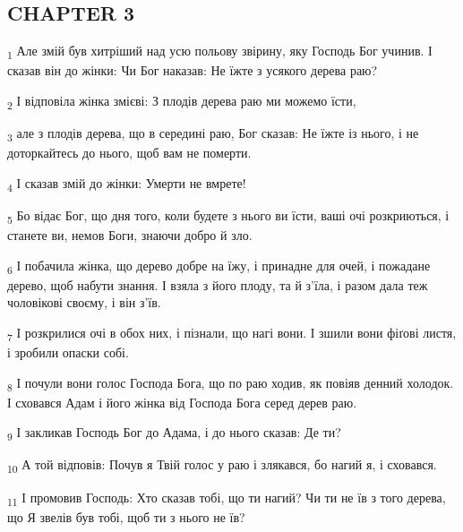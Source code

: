 \subsection{CHAPTER 3}
\begin{tcolorbox}
\textsubscript{1} Але змій був хитріший над усю польову звірину, яку Господь Бог учинив. І сказав він до жінки: Чи Бог наказав: Не їжте з усякого дерева раю?
\end{tcolorbox}
\begin{tcolorbox}
\textsubscript{2} І відповіла жінка змієві: З плодів дерева раю ми можемо їсти,
\end{tcolorbox}
\begin{tcolorbox}
\textsubscript{3} але з плодів дерева, що в середині раю, Бог сказав: Не їжте із нього, і не доторкайтесь до нього, щоб вам не померти.
\end{tcolorbox}
\begin{tcolorbox}
\textsubscript{4} І сказав змій до жінки: Умерти не вмрете!
\end{tcolorbox}
\begin{tcolorbox}
\textsubscript{5} Бо відає Бог, що дня того, коли будете з нього ви їсти, ваші очі розкриються, і станете ви, немов Боги, знаючи добро й зло.
\end{tcolorbox}
\begin{tcolorbox}
\textsubscript{6} І побачила жінка, що дерево добре на їжу, і принадне для очей, і пожадане дерево, щоб набути знання. І взяла з його плоду, та й з'їла, і разом дала теж чоловікові своєму, і він з'їв.
\end{tcolorbox}
\begin{tcolorbox}
\textsubscript{7} І розкрилися очі в обох них, і пізнали, що нагі вони. І зшили вони фіґові листя, і зробили опаски собі.
\end{tcolorbox}
\begin{tcolorbox}
\textsubscript{8} І почули вони голос Господа Бога, що по раю ходив, як повіяв денний холодок. І сховався Адам і його жінка від Господа Бога серед дерев раю.
\end{tcolorbox}
\begin{tcolorbox}
\textsubscript{9} І закликав Господь Бог до Адама, і до нього сказав: Де ти?
\end{tcolorbox}
\begin{tcolorbox}
\textsubscript{10} А той відповів: Почув я Твій голос у раю і злякався, бо нагий я, і сховався.
\end{tcolorbox}
\begin{tcolorbox}
\textsubscript{11} І промовив Господь: Хто сказав тобі, що ти нагий? Чи ти не їв з того дерева, що Я звелів був тобі, щоб ти з нього не їв?
\end{tcolorbox}
